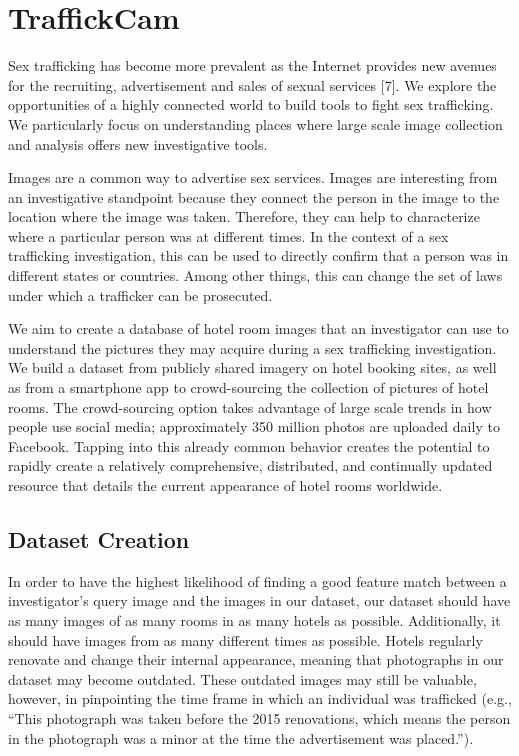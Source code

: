 
\chapter{TraffickCam}
\label{ch:3}
Sex trafficking has become more prevalent as the Internet provides new avenues for the recruiting, advertisement and sales of sexual services [7]. We explore the opportunities of a highly connected world to build tools to fight sex trafficking. We particularly focus on understanding places where large scale image collection and analysis offers new investigative tools.

Images are a common way to advertise sex services. Images are interesting from an investigative standpoint because they connect the person in the image to the location where the image was taken. Therefore, they can help to characterize where a particular person was at different times. In the context of a sex trafficking investigation, this can be used to
directly confirm that a person was in different states or countries. Among other things, this can change the set of laws under which a trafficker can be prosecuted.

We aim to create a database of hotel room images that an investigator can use to understand the pictures they may acquire during a sex trafficking investigation. We build a dataset from publicly shared imagery on hotel booking sites, as well as from a smartphone app to crowd-sourcing the collection of pictures of hotel rooms. The crowd-sourcing option
takes advantage of large scale trends in how people use social media; approximately 350 million photos are uploaded daily to Facebook. Tapping into this already common behavior creates the potential to rapidly create a relatively comprehensive, distributed,
and continually updated resource that details the current appearance of hotel rooms worldwide.

\section{Dataset Creation}
In order to have the highest likelihood of finding a good feature match between a investigator's query image and the images in our dataset, our dataset should have as many images of as many rooms in as many hotels as possible. Additionally, it should have images from as many different times as possible. Hotels regularly renovate and change their internal appearance, meaning that photographs in our dataset may become outdated. These outdated images may still be valuable, however, in pinpointing the time frame in which an individual was trafficked (e.g., ``This photograph was taken before the 2015 renovations, which means the person in the photograph was a minor at the time the advertisement was placed.'').

